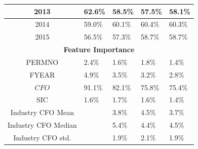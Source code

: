 {{\begin{table}[]
{\begin{tabular}{cllll}
\multicolumn{1}{|c|}{2013}                           & \multicolumn{1}{l|}{62.6\%}       & \multicolumn{1}{l|}{58.5\%}       & \multicolumn{1}{l|}{57.5\%}       & \multicolumn{1}{l|}{58.1\%}       \\ \hline
\multicolumn{1}{|c|}{2014}                           & \multicolumn{1}{l|}{59.0\%}       & \multicolumn{1}{l|}{60.1\%}       & \multicolumn{1}{l|}{60.4\%}       & \multicolumn{1}{l|}{60.3\%}       \\ \hline
\multicolumn{1}{|c|}{2015}                           & \multicolumn{1}{l|}{56.5\%}       & \multicolumn{1}{l|}{57.3\%}       & \multicolumn{1}{l|}{58.7\%}       & \multicolumn{1}{l|}{58.7\%}       \\ \hline
\multicolumn{5}{|c|}{\textbf{Feature Importance}}                                                                                                                                                    \\ \hline
\multicolumn{1}{|c|}{PERMNO}                         & \multicolumn{1}{l|}{2.4\%}        & \multicolumn{1}{l|}{1.6\%}        & \multicolumn{1}{l|}{1.8\%}        & \multicolumn{1}{l|}{1.4\%}        \\ \hline
\multicolumn{1}{|c|}{FYEAR}                          & \multicolumn{1}{l|}{4.9\%}        & \multicolumn{1}{l|}{3.5\%}        & \multicolumn{1}{l|}{3.2\%}        & \multicolumn{1}{l|}{2.8\%}        \\ \hline
\multicolumn{1}{|c|}{$CFO$}                          & \multicolumn{1}{l|}{91.1\%}       & \multicolumn{1}{l|}{82.1\%}       & \multicolumn{1}{l|}{75.8\%}       & \multicolumn{1}{l|}{75.4\%}       \\ \hline
\multicolumn{1}{|c|}{SIC}                            & \multicolumn{1}{l|}{1.6\%}        & \multicolumn{1}{l|}{1.7\%}        & \multicolumn{1}{l|}{1.6\%}        & \multicolumn{1}{l|}{1.4\%}        \\ \hline
\multicolumn{1}{|c|}{Industry CFO Mean}              & \multicolumn{1}{l|}{}             & \multicolumn{1}{l|}{3.8\%}        & \multicolumn{1}{l|}{4.5\%}        & \multicolumn{1}{l|}{3.7\%}        \\ \hline
\multicolumn{1}{|c|}{Industry CFO Median}            & \multicolumn{1}{l|}{}             & \multicolumn{1}{l|}{5.4\%}        & \multicolumn{1}{l|}{4.4\%}        & \multicolumn{1}{l|}{4.5\%}        \\ \hline
\multicolumn{1}{|c|}{Industry CFO std.}              & \multicolumn{1}{l|}{}             & \multicolumn{1}{l|}{1.9\%}        & \multicolumn{1}{l|}{2.1\%}        & \multicolumn{1}{l|}{1.9\%}        \\ \hline

\end{tabular}}
\end{table}}}
